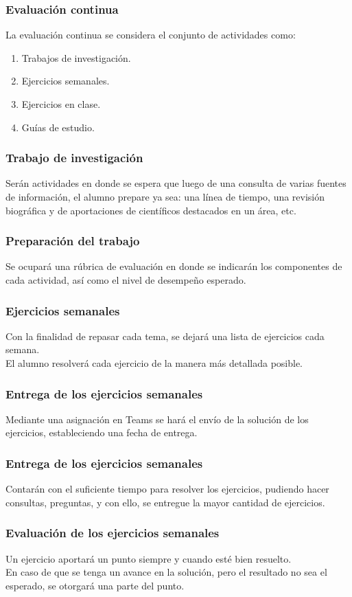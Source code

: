 \documentclass[14pt]{beamer}
\begin{document}
\begin{frame}
\frametitle{Evaluación continua}
La evaluación continua se considera el conjunto de actividades como: 
\begin{enumerate}[<+->]
\item Trabajos de investigación.
\item Ejercicios semanales.
\item Ejercicios en clase.
\item Guías de estudio.
\end{enumerate}
\end{frame}
\begin{frame}
\frametitle{Trabajo de investigación}
Serán actividades en donde se espera que luego de una consulta de varias fuentes de información, el alumno prepare ya sea: una línea de tiempo, una revisión biográfica y de aportaciones de científicos destacados en un área, etc.
\end{frame}
\begin{frame}
\frametitle{Preparación del trabajo}
Se ocupará una rúbrica de evaluación en donde se indicarán los componentes de cada actividad, así como el nivel de desempeño esperado.
\end{frame}
\begin{frame}
\frametitle{Ejercicios semanales}
Con la finalidad de repasar cada tema, se dejará una lista de ejercicios cada semana.
\\
\bigskip
\pause
El alumno resolverá cada ejercicio de la manera más detallada posible.
\end{frame}
\begin{frame}
\frametitle{Entrega de los ejercicios semanales}
Mediante una asignación en Teams se hará el envío de la solución de los ejercicios, \pause estableciendo una fecha de entrega.
\end{frame}
\begin{frame}
\frametitle{Entrega de los ejercicios semanales}
Contarán con el suficiente tiempo para resolver los ejercicios, pudiendo hacer consultas, preguntas, y con ello, se entregue la mayor cantidad de ejercicios.
\end{frame}
\begin{frame}
\frametitle{Evaluación de los ejercicios semanales}
Un ejercicio aportará un punto siempre y cuando esté bien resuelto.
\\
\bigskip
\pause
En caso de que se tenga un avance en la solución, pero el resultado no sea el esperado, se otorgará una parte del punto.
\end{frame}
\end{document}
